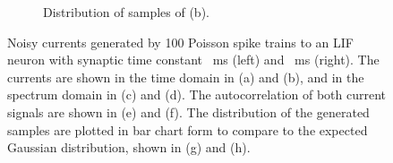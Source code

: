 \begin{figure}[tbp!]
\begin{subfigure}[t]{0.43\textwidth}
			\caption{Distribution of samples of (b).}
		\end{subfigure}
		\DIFdelbeginFL %
\DIFdelendFL \DIFaddbeginFL \caption[Noisy currents generated by Poisson spike trains.]{\DIFaddendFL Noisy currents generated by 100 Poisson spike trains to an LIF neuron with synaptic time constant \DIFdelbeginFL {}\DIFdelendFL \DIFaddbeginFL {}~ms (left) and \DIFdelbeginFL {}\DIFdelendFL \DIFaddbeginFL {}~ms (right). The currents are shown in the time domain in (a) and (b), and in the spectrum domain in (c) and (d). The autocorrelation of both current signals are shown in (e) and (f). The distribution of the generated samples are plotted in bar chart form to compare to the expected Gaussian distribution, shown in (g) and (h).}
		\label{Fig:lif_pois}
	\end{figure}

